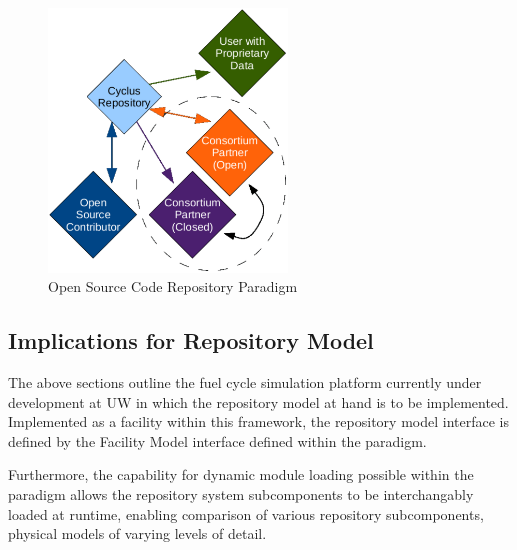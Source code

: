
\begin{figure}[h]
  \begin{center}
    \includegraphics[height=7cm]{./chapters/paradigm/openness.png}
  \end{center}
  \caption{\Cyclus Open Source Code Repository Paradigm}
  \label{fig:openness}
\end{figure}
\subsection{Implications for Repository Model}

The above sections outline the fuel cycle simulation platform
currently under development at \gls{UW} in which the repository model
at hand is to be implemented.  Implemented as a facility within this 
framework, the repository model interface is defined by the Facility
Model interface defined within the \Cyclus paradigm. 

Furthermore, the capability for dynamic module loading possible within 
the \Cyclus paradigm allows the repository system subcomponents to be 
interchangably loaded at runtime, enabling comparison of various 
repository subcomponents, physical models of varying levels of detail. 



